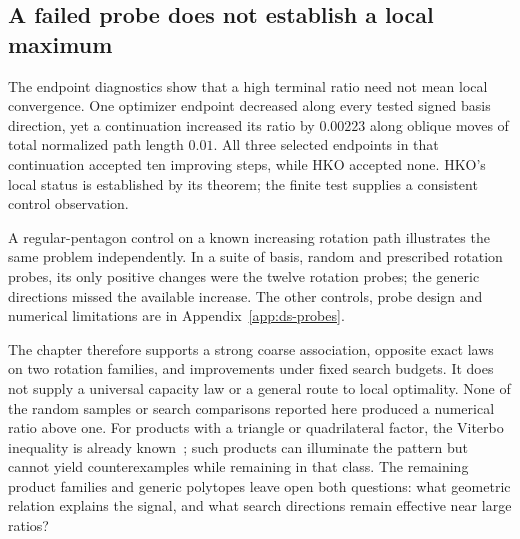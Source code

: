 \subsection{A failed probe does not establish a local maximum}

The endpoint diagnostics show that a high terminal ratio need not mean
local convergence. One optimizer endpoint decreased along every tested
signed basis direction, yet a continuation increased its ratio by
$0.00223$ along oblique moves of total normalized path length $0.01$.
All three selected endpoints in that continuation accepted ten improving
steps, while HKO accepted none. HKO's local status is established by its
theorem; the finite test supplies a consistent control observation.

A regular-pentagon control on a known increasing rotation path illustrates
the same problem independently. In a suite of basis, random and prescribed
rotation probes, its only positive changes were the twelve rotation
probes; the generic directions missed the available increase. The other
controls, probe design and numerical limitations are in
Appendix~\ref{app:ds-probes}.

The chapter therefore supports a strong coarse association, opposite
exact laws on two rotation families, and improvements under fixed search budgets. It does
not supply a universal capacity law or a general route to local optimality.
None of the random samples or search comparisons reported here produced a numerical
ratio above one. For products with a triangle or quadrilateral factor,
the Viterbo inequality is already known~\cite[Theorem~1.2 and Section~4]{dsBMP2026};
such products can illuminate the pattern but cannot yield counterexamples
while remaining in that class. The remaining product families and generic
polytopes leave open both questions: what geometric relation explains the
signal, and what search directions remain effective near large ratios?
